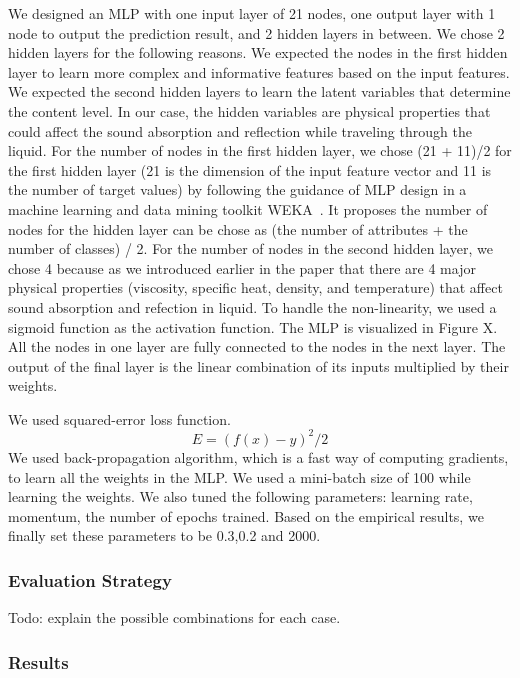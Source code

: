 \documentclass{article} %
\begin{document}
We designed an MLP with one input layer of 21 nodes, one output layer with 1 node to output the prediction result, and 2 hidden layers in between. We chose 2 hidden layers for the following reasons. We expected the nodes in the first hidden layer to learn more complex and informative features based on the input features. We expected the second hidden layers to learn the latent variables that determine the content level. In our case, the hidden variables are physical properties that could affect the sound absorption and reflection while traveling through the liquid. For the number of nodes in the first hidden layer, we chose (21 + 11)/2 for the first hidden layer (21 is the dimension of the input feature vector and 11 is the number of target values) by following the guidance of MLP design in a machine learning and data mining toolkit WEKA~\cite{hall2009weka}. It proposes the number of nodes for the hidden layer can be chose as (the number of attributes + the number of classes) / 2. For the number of nodes in the second hidden layer, we chose 4 because as we introduced earlier in the paper that there are 4 major physical properties (viscosity, specific heat, density, and temperature) that affect sound absorption and refection in liquid. To handle the non-linearity, we used a sigmoid function as the activation function. The MLP is visualized in Figure X. All the nodes in one layer are fully connected to the nodes in the next layer. The output of the final layer is the linear combination of its inputs multiplied by their weights.

We used squared-error loss function.\begin{equation} E=(f(x)-y)^2/2\end{equation} We used back-propagation algorithm, which is a fast way of computing gradients, to learn all the weights in the MLP. We used a mini-batch size of 100 while learning the weights. We also tuned the following parameters: learning rate, momentum, the number of epochs trained. Based on the empirical results, we finally set these parameters to be 0.3,0.2 and 2000.
 

\subsubsection{Evaluation Strategy}
Todo: explain the possible combinations for each case.

\subsubsection{Results}
\end{document}

